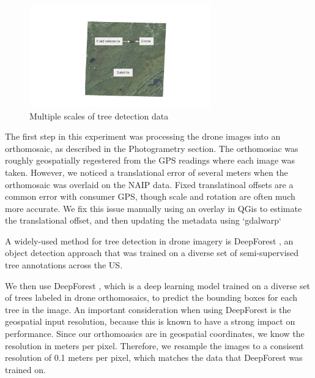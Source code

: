 \begin{figure}
    \centering
    \includegraphics[width=0.7\textwidth, trim={6cm 0cm 5cm 1cm},clip]{figs/methods/tree_detection/multi_scale_data.pdf}
    \caption{Multiple scales of tree detection data}
    \label{fig:methods:multi_scale_tree_det}
\end{figure}
The first step in this experiment was processing the drone images into an orthomosaic, as described in the Photogrametry section. The orthomosiac was roughly geospatially regestered from the GPS readings where each image was taken. However, we noticed a translational error of several meters when the orthomosaic was overlaid on the NAIP data. Fixed translatinoal offsets are a common error with consumer GPS, though scale and rotation are often much more accurate. We fix this issue manually using an overlay in QGis to estimate the translational offset, and then updating the metadata using `gdalwarp`  




A widely-used method for tree detection in drone imagery is DeepForest \cite{Weinstein2020DeepForest:Delineation}, an object detection approach that was trained on a diverse set of semi-supervised tree annotations across the US. 


We then use DeepForest \cite{Weinstein2020DeepForest:Delineation}, which is a deep learning model trained on a diverse set of trees labeled in drone orthomosaics, to predict the bounding boxes for each tree in the image. An important consideration when using DeepForest is the geospatial input resolution, because this is known to have a strong impact on performance. Since our orthomoasics are in geospatial coordinates, we know the resolution in meters per pixel. Therefore, we resample the images to a consisent resolution of 0.1 meters per pixel, which matches the data that DeepForest was trained on.

